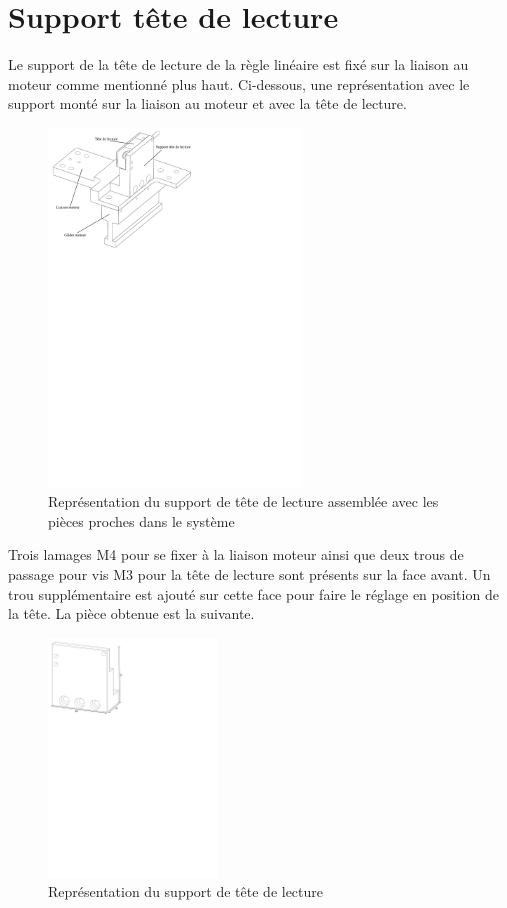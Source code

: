 \section{Support tête de lecture}\label{sec:SupTeteLect}
Le support de la tête de lecture de la règle linéaire est fixé sur la liaison au moteur comme mentionné plus haut. Ci-dessous, une représentation
avec le support monté sur la liaison au moteur et avec la tête de lecture.

\begin{figure}[H]
    \centering
    \includegraphics[width = 0.6\textwidth]{assets/figures/AssemblageMesureLineaire.svg}
    \caption{Représentation du support de tête de lecture assemblée avec les pièces proches dans le système}
    \label{fig:AssMesLin}
\end{figure}

Trois lamages M4 pour se fixer à la liaison moteur ainsi que deux trous de passage pour vis M3 pour la tête de lecture sont présents sur la face
avant. Un trou supplémentaire est ajouté sur cette face pour faire le réglage en position de la tête. La pièce obtenue est la suivante.

\begin{figure}[H]
    \centering
    \includegraphics[width = 0.4\textwidth]{assets/figures/SupportTeteLecture.svg}
    \caption{Représentation du support de tête de lecture}
    \label{fig:SupTeteLect}
\end{figure}

